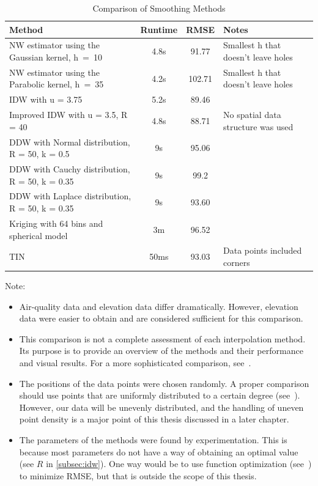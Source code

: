 \begin{table}[H]
    \centering
    \caption{Comparison of Smoothing Methods}
    \begin{tabular}{| p{18em} | c | c | >{\centering\arraybackslash}p{9em} |} %
        \hline %
        Method & Runtime & RMSE & Notes \\
        \hline %
        NW estimator using the Gaussian kernel, h~=~10 & 4.8s & 91.77 & Smallest h that doesn't leave holes\\
        NW estimator using the Parabolic kernel, h~=~35 & 4.2s & 102.71 & Smallest h that doesn't leave holes\\
        IDW with u = 3.75 & 5.2s & 89.46 & \\
        Improved IDW with u = 3.5, R = 40 & 4.8s & 88.71 & No spatial data structure was used \\
        DDW with Normal distribution, R = 50, k = 0.5 & 9s & 95.06 & \\
        DDW with Cauchy distribution, R = 50, k = 0.35 & 9s & 99.2 & \\
        DDW with Laplace distribution, R = 50, k = 0.35 & 9s & 93.60 & \\
        Kriging with 64 bins and spherical model & 3m & 96.52 & \\
        TIN & 50ms & 93.03 & Data points included corners \\
        \hline %
    \end{tabular}
\end{table}

Note:
\begin{itemize}
    \item Air-quality data and elevation data differ dramatically. However, elevation data were easier to obtain and are considered sufficient for this comparison.
    \item This comparison is not a complete assessment of each interpolation method. Its purpose is to provide an overview of the methods and their performance and visual results. For a more sophisticated comparison, see\ \cite{shape:book01}.
    \item The positions of the data points were chosen randomly. A proper comparison should use points that are uniformly distributed to a certain degree (see\ \cite{mdpi:01}). However, our data will be unevenly distributed, and the handling of uneven point density is a major point of this thesis discussed in a later chapter.
    \item The parameters of the methods were found by experimentation. This is because most parameters do not have a way of obtaining an optimal value (see $R$ in \autoref{subsec:idw}). One way would be to use function optimization (see\ \cite{other:scipy_optimization}) to minimize RMSE, but that is outside the scope of this thesis.
\end{itemize}

